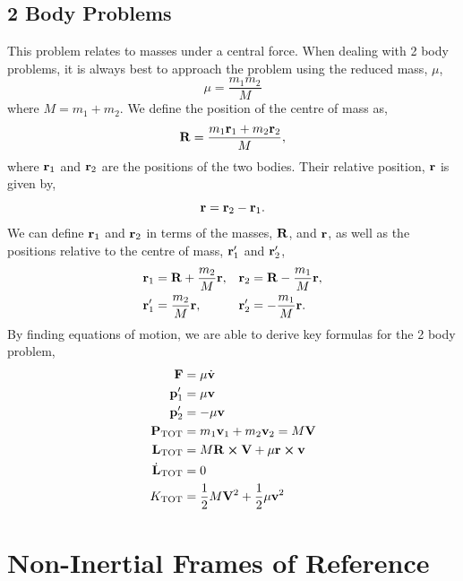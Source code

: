 \documentclass{book}
\begin{document}
\section{2 Body Problems}
This problem relates to masses under a central force. When dealing with 2 body problems, it is always best to approach the problem using the reduced mass, $\mu$,
\begin{equation}
    \mu = \frac{m_1m_2}{M}
\end{equation}
where $M = m_1 + m_2$. We define the position of the centre of mass as,
\begin{equation}
    \vb{R} = \frac{m_1\vb{r}_1 + m_2\vb{r}_2}{M},
\end{equation}
where $\vb{r}_1$ and $\vb{r}_2$ are the positions of the two bodies. Their relative position, $\vb{r}$ is given by, 
\begin{equation}
    \vb{r} = \vb{r}_2 - \vb{r}_1.
\end{equation}
We can define $\vb{r}_1$ and $\vb{r}_2$ in terms of the masses, $\vb{R}$, and $\vb{r}$, as well as the positions relative to the centre of mass, $\vb{r}_1'$ and $\vb{r}_2'$,
\begin{align}
    \vb{r}_1 &= \vb{R} + \frac{m_2}{M}\vb{r}, & \vb{r}_2 & = \vb{R} - \frac{m_1}{M}\vb{r},\\
    \vb{r}_1' &= \frac{m_2}{M}\vb{r}, & \vb{r}_2' &= -\frac{m_1}{M}\vb{r}.
\end{align}
By finding equations of motion, we are able to derive key formulas for the 2 body problem,
\begin{align}
    \vb{F} &= \mu \Dot{\vb{v}} \\
    \vb{p}_1' &= \mu\vb{v}\\
    \vb{p}_2' &= -\mu\vb{v}\\
    \vb{P}_{\text{TOT}} &= m_1\vb{v}_1 + m_2\vb{v}_2 = M\vb{V}\\
    \vb{L}_{\text{TOT}} &= M\vb{R}\cross\vb{V} + \mu\vb{r}\cross\vb{v}\\
    \Dot{\vb{L}}_{\text{TOT}} &= 0 \\
    K_{\text{TOT}} & = \frac{1}{2}M\vb{V}^2 + \frac{1}{2}\mu\vb{v}^2
\end{align}

\chapter{Non-Inertial Frames of Reference}
\end{document}
